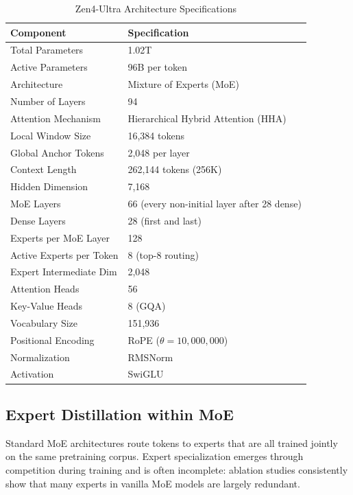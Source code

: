 \documentclass[11pt,a4paper]{article}
\begin{document}
\begin{table}[H]
\centering
\begin{tabular}{ll}
\toprule
\textbf{Component} & \textbf{Specification} \\
\midrule
Total Parameters           & 1.02T \\
Active Parameters          & 96B per token \\
Architecture               & Mixture of Experts (MoE) \\
Number of Layers           & 94 \\
Attention Mechanism        & Hierarchical Hybrid Attention (HHA) \\
Local Window Size          & 16,384 tokens \\
Global Anchor Tokens       & 2,048 per layer \\
Context Length             & 262,144 tokens (256K) \\
Hidden Dimension           & 7,168 \\
MoE Layers                 & 66 (every non-initial layer after 28 dense) \\
Dense Layers               & 28 (first and last) \\
Experts per MoE Layer      & 128 \\
Active Experts per Token   & 8 (top-8 routing) \\
Expert Intermediate Dim    & 2,048 \\
Attention Heads            & 56 \\
Key-Value Heads            & 8 (GQA) \\
Vocabulary Size            & 151,936 \\
Positional Encoding        & RoPE ($\theta = 10{,}000{,}000$) \\
Normalization              & RMSNorm \\
Activation                 & SwiGLU \\
\bottomrule
\end{tabular}
\caption{Zen4-Ultra Architecture Specifications}
\end{table}

\subsection{Expert Distillation within MoE}

Standard MoE architectures route tokens to experts that are all trained jointly on the
same pretraining corpus. Expert specialization emerges through competition during training
and is often incomplete: ablation studies consistently show that many experts in vanilla
MoE models are largely redundant.
\end{document}
